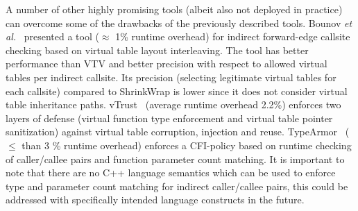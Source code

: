 A number of other highly promising tools (albeit also not deployed in practice) can overcome some of the drawbacks of the previously described tools. 
Bounov \textit{et al.}~\cite{bounov:interleaving} presented a tool ($\approx$ 1\% runtime overhead)
for indirect forward-edge callsite checking based on virtual table layout interleaving. The tool has better performance than VTV and better precision with
respect to allowed virtual tables per indirect callsite. Its precision (selecting legitimate virtual tables for each callsite) compared to ShrinkWrap is
lower since it does not consider virtual table inheritance paths. vTrust~\cite{zhang:vtrust} (average runtime overhead 2.2\%) enforces two layers of defense
(virtual function type enforcement and virtual table pointer sanitization) against virtual table corruption, injection and reuse. TypeArmor~\cite{veen:typearmor}
($\le$ than 3 \% runtime overhead) enforces a CFI-policy based on runtime checking of caller/callee pairs and function parameter count matching. It is important to note 
that there are no C++ language semantics which can be used to enforce type and parameter count matching for indirect caller/callee pairs, this could be addressed
with specifically intended language constructs in the future.



